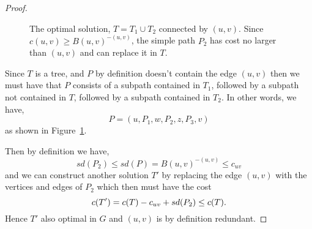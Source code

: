 \begin{proof}
\begin{figure}[h!]
\begin{tikzpicture}[auto, node distance=1.3 cm]
  \end{tikzpicture}
  \caption{The optimal solution, $T = T_1 \cup T_2$ connected by $(u,v)$.
    Since $c(u,v) \geq B(u,v)^{-(u,v)}$,
  the simple path $P_2$ has cost no larger than $(u,v)$ and can replace it in $T$.}\label{fig:red:test:sd:thm}
\end{figure}
   
   Since $T$ is a tree, and $P$ by definition doesn't contain the edge $(u,v)$
   then we must have that $P$ consists of a subpath contained in $T_1$, followed by
   a subpath not contained in $T$, followed by a subpath contained in $T_2$.
   In other words, we have,
   \[P = (u, P_1, w, P_2, z, P_3, v)\]
   as shown in Figure~\ref{fig:red:test:sd:thm}.

   Then by definition we have,
   \[sd(P_2) \leq sd(P) = B(u,v)^{-(u,v)} \leq c_{uv}\]
   and we can construct another solution $T'$ by replacing the edge
   $(u,v)$ with the
   vertices and edges of $P_2$ which then must have the cost
   \[c(T') = c(T) - c_{uv} + sd(P_2) \leq c(T)\mathnormal{.}\]
   Hence $T'$ also optimal in $G$ and $(u,v)$ is by definition redundant.
\end{proof}

